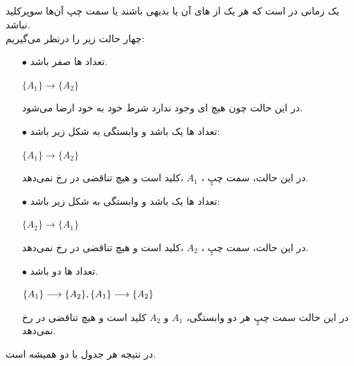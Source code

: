 \documentclass{article}
\begin{document}
\subsection{}
یک  زمانی در  است که هر یک از های آن یا بدیهی باشند یا سمت چپ آن‌ها سوپرکلید نباشد.
\\
چهار حالت زیر را درنظر می‌گیریم:
\begin{itemize}
    \item [$\bullet$] تعداد ها صفر باشد.

\begin{latin}
$
\{A_{1}\}\longrightarrow\{A_{2}\}
$
\end{latin}
در این حالت چون هیچ ای وجود ندارد شرط  خود به خود ارضا می‌شود.
%
    \item [$\bullet$] تعداد ها یک باشد و وابستگی به شکل زیر باشد:

\begin{latin}
$
\{A_{1}\}\longrightarrow\{A_{2}\}
$
\end{latin}
در این حالت، سمت چپِ ،
$
A_{1}
$
،کلید است و هیچ تناقضی در  رخ نمی‌دهد.
%
    \item [$\bullet$] تعداد ها یک باشد و وابستگی به شکل زیر باشد:

\begin{latin}
$
\{A_{2}\}\longrightarrow\{A_{1}\}
$
\end{latin}
در این حالت، سمت چپِ ،
$
A_{2}
$
،کلید است و هیچ تناقضی در  رخ نمی‌دهد.
%
    \item [$\bullet$] تعداد ها دو باشد.

\begin{latin}

$
\{A_{1}\}\longrightarrow\{A_{2}\},\\
\{A_{1}\}\longrightarrow\{A_{2}\}
$
\end{latin}
در این حالت سمت چپِ هر دو وابستگی،
$
A_{1}
$
و
$
A_{2}
$
کلید است و هیچ تناقضی در  رخ نمی‌دهد.
\end{itemize}
در نتیجه هر جدول با دو  همیشه  است.
\end{document}
